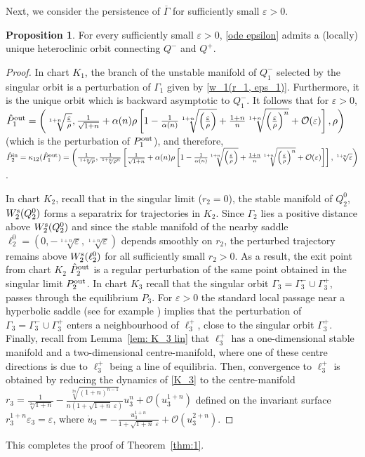 \documentclass{article}
\theoremstyle{definition}
\numberwithin{equation}{section}
\newtheorem{prop}{Proposition}
\begin{document}
Next, we consider the persistence of $\overline{\Gamma}$ for sufficiently small $\varepsilon>0$.
\begin{prop}
    For every sufficiently small $\varepsilon>0$, \eqref{ode epsilon} admits a (locally) unique heteroclinic orbit connecting $Q^-$ and $Q^+$.
\end{prop}
\begin{proof}
    In chart $K_1$, the branch of the unstable manifold of $Q_1^-$ selected by the singular orbit is a perturbation of $\Gamma_1$ given by \eqref{w_1(r_1, eps_1)}. Furthermore, it is the unique orbit which is backward asymptotic to $Q_1^-$. It follows that for $\varepsilon>0$, $\hat{P}_1^{\rm out}=\left(\sqrt[1+n]{\tfrac{\varepsilon}{\rho}},\tfrac{1}{\sqrt{1+n}}+\alpha(n)\rho
    \left[
    1-\tfrac{1}{\alpha(n)}
    \sqrt[1+n]{\left(\tfrac{\varepsilon}{\rho}\right)}
    +\tfrac{1+n}{n}
    \sqrt[1+n]{\left(\tfrac{\varepsilon}{\rho}\right)^n}
    +\mathcal{O}(\varepsilon)
    \right],\rho  \right)$ (which is the perturbation of $P_1^{\rm out}$), and therefore, $\hat{P}_2^{\rm in}=\kappa_{12}(\hat{P}_1^{\rm out})=\left(\tfrac{1}{\sqrt[1+n]{\rho}},\tfrac{1}{\sqrt[1+n]{\rho^n}}\left[\tfrac{1}{\sqrt{1+n}}+\alpha(n)\rho
    \left[
    1-\tfrac{1}{\alpha(n)}
    \sqrt[1+n]{\left(\tfrac{\varepsilon}{\rho}\right)}
    +\tfrac{1+n}{n}
    \sqrt[1+n]{\left(\tfrac{\varepsilon}{\rho}\right)^n}
    +\mathcal{O}(\varepsilon)
    \right]\right],\sqrt[1+n]{\varepsilon}  \right)$.

    In chart $K_2$, recall that in the singular limit ($r_2=0$), the stable manifold of $Q_2^0$, $W_2^{\rm s}(Q_2^0)$ forms a separatrix for trajectories in $K_2$. Since $\Gamma_2$ lies a positive distance above $W_2^{\rm s}(Q_2^0)$ and since the stable manifold of the nearby saddle $\ell_2^0=(0, -\sqrt[1+n]{\varepsilon}, \sqrt[1+n]{\varepsilon})$ depends smoothly on $r_2$, the perturbed trajectory remains above $W_2^{\rm s}(\ell_2^0)$ for all sufficiently small $r_2>0$.
    As a result, the exit point from chart $K_2$ $\hat{P}_2^{\rm out}$ is a regular perturbation of the same point obtained in the singular limit $P_2^{\rm out}$.  
    In chart $K_3$ recall that the singular orbit $\Gamma_3=\Gamma_3^-\cup\Gamma_3^+$, passes through the equilibrium $P_3$. For $\varepsilon>0$ the standard local passage near a hyperbolic saddle (see for example \cite{POPOVIC20121976}) implies that the perturbation of $\Gamma_3=\Gamma_3^-\cup\Gamma_3^+$ enters a neighbourhood of $\ell_3^+$, close to the singular orbit $\Gamma_3^+$. Finally, recall from Lemma~\ref{lem: K_3 lin} that $\ell_3^+$ has a one-dimensional stable manifold and a two-dimensional centre-manifold, where one of these centre directions is due to $\ell_3^+$ being a line of equilibria. Then, convergence to $\ell_3^+$ is obtained by reducing the dynamics of \eqref{K_3} to the centre-manifold $r_3=\tfrac{1}{\sqrt[2n]{1+n}}-\tfrac{\sqrt[2n]{(1+n)^{n-1}}}{n(1+\sqrt{1+n}\;\varepsilon)}u_3^n+\mathcal{O}(u_3^{1+n})$ defined on the invariant surface $r_3^{1+n}\varepsilon_3=\varepsilon$, where $\dot{u}_3=-\tfrac{u_3^{1+n}}{1+\sqrt{1+n}\;\varepsilon}+\mathcal{O}(u_3^{2+n})$.
\end{proof}
This completes the proof of Theorem~\ref{thm:1}.
\end{document}

